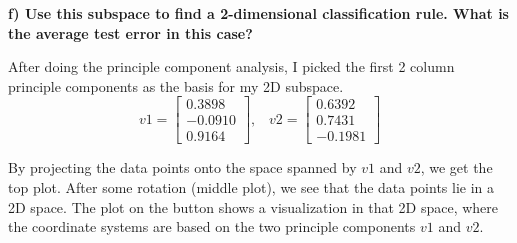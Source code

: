 \documentclass[paper=a4, fontsize=11pt]{scrartcl} %
\numberwithin{equation}{section} %
\numberwithin{figure}{section} %
\numberwithin{table}{section} %
\begin{document}
\newpage
\textbf{f) Use this subspace to find a 2-dimensional classification rule. What is the average test error in this case?}

After doing the principle component analysis, I picked the first 2 column principle components as the basis for my 2D subspace. 
$$
v1 = 
\begin{bmatrix}
    0.3898   \\
   -0.0910   \\
    0.9164   
\end{bmatrix},
\;\;\;
v2 = 
\begin{bmatrix}
0.6392	\\
0.7431	\\
-0.1981
\end{bmatrix}
$$

By projecting the data points onto the space spanned by $v1$ and $v2$, we get the top plot. After some rotation (middle plot), we see that the data points lie in a 2D space. The plot on the button shows a visualization in that 2D space, where the coordinate systems are based on the two principle components $v1$ and $v2$. 
\end{document}
